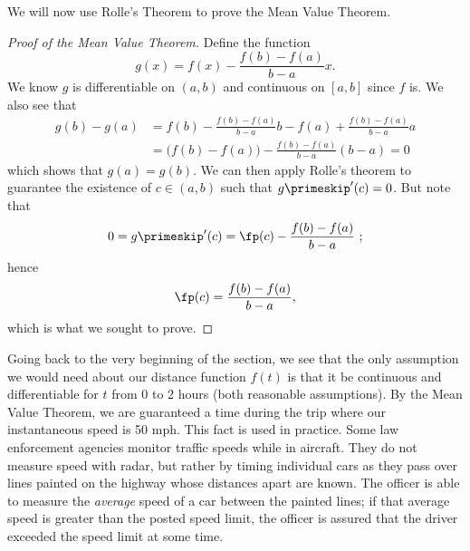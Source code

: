 
We will now use Rolle's Theorem to prove the Mean Value Theorem.

\begin{proof}[Proof of the Mean Value Theorem]
Define the function $$g(x) = f(x) - \frac{f(b)-f(a)}{b-a}x.$$  We know $g$ is differentiable on $(a,b)$ and  continuous on $[a,b]$ since $f$ is.  We also see that
\begin{align*}
g(b)-g(a)&=f(b)-\frac{f(b)-f(a)}{b-a}b-f(a)+\frac{f(b)-f(a)}{b-a}a\\
&=\bigl(f(b)-f(a)\bigr)-\frac{f(b)-f(a)}{b-a}(b-a)=0
\end{align*}
which shows that $g(a)=g(b)$. We can then apply Rolle's theorem to guarantee the existence of $c \in (a,b)$ such that $g\primeskip'(c) = 0$.  But note that
$$0= g\primeskip'(c) = \fp(c) - \frac{f(b)-f(a)}{b-a} \ ;$$
hence
$$\fp(c) = \frac{f(b)-f(a)}{b-a},$$
which is what we sought to prove.
\end{proof}

Going back to the very beginning of the section, we see that the only assumption we would need about our distance function $f(t)$ is that it be continuous and differentiable for $t$ from 0 to 2 hours (both reasonable assumptions).  By the Mean Value Theorem, we are guaranteed a time during the trip where our instantaneous speed is 50 mph. This fact is used in practice. Some law enforcement agencies monitor traffic speeds while in aircraft. They do not measure speed with radar, but rather by timing individual cars as they pass over lines painted on the highway whose distances apart are known. The officer is able to measure the \textit{average} speed of a car between the painted lines; if that average speed is greater than the posted speed limit, the officer is assured that the driver exceeded the speed limit at some time.

